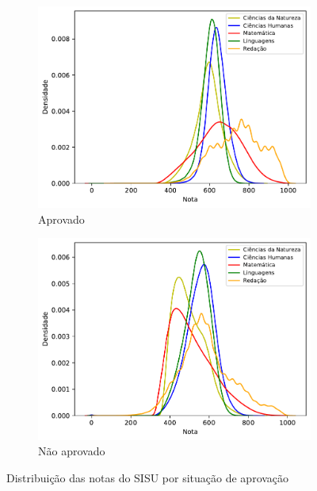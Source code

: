             \begin{figure}[h]
                \centering
            
                \begin{subfigure}{0.90\textwidth}
                    \centering
                    \includegraphics[width=\linewidth]{figuras/distribuicao_notas_aprovados.pdf}
                    \caption{Aprovado}
                \end{subfigure}
                \hfill
                \begin{subfigure}{0.90\textwidth}
                    \centering
                    \includegraphics[width=\linewidth]{figuras/distribuicao_notas_nao_aprovados.pdf}
                    \caption{Não aprovado}
                \end{subfigure}
            
                \caption{Distribuição das notas do SISU por situação de aprovação}
                \label{fig:nota-aprovacao}
            \end{figure}
    
